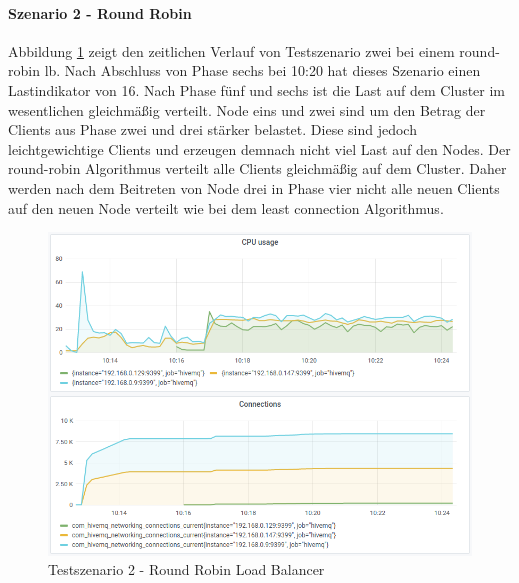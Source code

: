 \paragraph{Szenario 2 - Round Robin}
Abbildung \ref{fig:s2-rr} zeigt den zeitlichen Verlauf von Testszenario zwei bei einem round-robin \ac{lb}.
Nach Abschluss von Phase sechs bei 10:20 hat dieses Szenario einen Lastindikator von 16.
Nach Phase fünf und sechs ist die Last auf dem Cluster im wesentlichen gleichmä{\ss}ig verteilt. Node eins und zwei sind um den Betrag der Clients aus Phase zwei und drei stärker belastet. Diese sind jedoch leichtgewichtige Clients und erzeugen demnach nicht viel Last auf den Nodes.
Der round-robin Algorithmus verteilt alle Clients gleichmä{\ss}ig auf dem Cluster. Daher werden nach dem Beitreten von Node drei in Phase vier nicht alle neuen Clients auf den neuen Node verteilt wie bei dem least connection Algorithmus.
\begin{figure}
    \centering
    \includegraphics[scale=0.8]{images/s2_rr.png}
    \caption{Testszenario 2 - Round Robin Load Balancer}
    \label{fig:s2-rr}
\end{figure}

